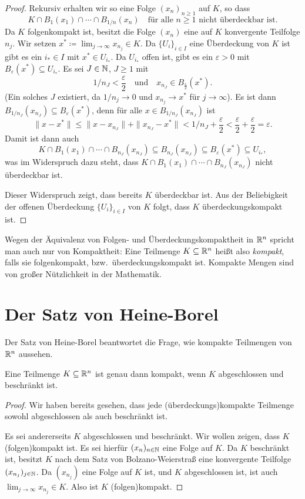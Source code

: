 \documentclass[a4paper,10pt]{article}
\begin{document}
\begin{proof}
 Rekursiv erhalten wir so eine Folge $(x_n)_{n \geq 1}$ auf $K$, so dass
 \[
  K \cap B_1(x_1) \cap \dotsb \cap B_{1/n}(x_n)
  \quad \text{für alle $n \geq 1$ nicht überdeckbar ist}.
 \]
 Da $K$ folgenkompakt ist, besitzt die Folge $(x_n)$ eine auf $K$ konvergente Teilfolge $n_j$. Wir setzen $x^* \coloneqq \lim_{j \to \infty} x_{n_j} \in K$. Da $\{U_i\}_{i \in I}$ eine Überdeckung von $K$ ist gibt es ein $i_* \in I$ mit $x^* \in U_{i_*}$. Da $U_{i_*}$ offen ist, gibt es ein $\varepsilon > 0$ mit $B_{\varepsilon}(x^*) \subseteq U_{i_*}$. Es sei $J \in \mathbb{N}$, $J \geq 1$ mit
 \[
  1/{n_J} < \frac{\varepsilon}{2}
  \quad
  \text{und}
  \quad
  x_{n_J} \in B_\frac{\varepsilon}{2}(x^*).
 \]
 (Ein solches $J$ existiert, da $1/{n_j} \to 0$ und $x_{n_j} \to x^*$ für $j \to \infty$). Es ist dann $B_{1/n_J}(x_{n_J}) \subseteq B_{\varepsilon}(x^*)$, denn für alle $x \in B_{1/n_J}(x_{n_J})$ ist
 \[
  \|x - x^*\|
  \leq \|x - x_{n_J}\| + \|x_{n_J} - x^*\|
  < 1/n_J + \frac{\varepsilon}{2}
  < \frac{\varepsilon}{2} + \frac{\varepsilon}{2}
  = \varepsilon.
 \]
 Damit ist dann auch
 \[
  K \cap B_1(x_1) \cap \dotsb \cap B_{n_J}(x_{n_J})
  \subseteq B_{n_J}(x_{n_J})
  \subseteq B_{\varepsilon}(x^*)
  \subseteq U_{i_*},
 \]
 was im Widerspruch dazu steht, dass $K \cap B_1(x_1) \cap \dotsb \cap B_{n_J}(x_{n_J})$ nicht überdeckbar ist.
  
 Dieser Widerspruch zeigt, dass bereits $K$ überdeckbar ist. Aus der Beliebigkeit der offenen Überdeckung $\{U_i\}_{i \in I}$ von $K$ folgt, dass $K$ überdeckungskompakt ist.
\end{proof}


Wegen der Äquivalenz von Folgen- und Überdeckungskompaktheit in $\mathbb{R}^n$ spricht man auch nur von Kompaktheit: Eine Teilmenge $K \subseteq \mathbb{R}^n$ heißt also \emph{kompakt}, falls sie folgenkompakt, bzw.\ überdeckungskompakt ist. Kompakte Mengen sind von großer Nützlichkeit in der Mathematik.




\section{Der Satz von Heine-Borel}
Der Satz von Heine-Borel beantwortet die Frage, wie kompakte Teilmengen von $\mathbb{R}^n$ aussehen.


\begin{thrm}
 Eine Teilmenge $K \subseteq \mathbb{R}^n$ ist genau dann kompakt, wenn $K$ abgeschlossen und beschränkt ist.
\end{thrm}
\begin{proof}
 Wir haben bereits gesehen, dass jede (überdeckungs)kompakte Teilmenge sowohl abgeschlossen als auch beschränkt ist.
 
 Es sei andererseits $K$ abgeschlossen und beschränkt. Wir wollen zeigen, dass $K$ (folgen)kompakt ist. Es sei hierfür $(x_n)_{n \in \mathbb{N}}$ eine Folge auf $K$. Da $K$ beschränkt ist, besitzt $K$ nach dem Satz von Bolzano-Weierstraß eine konvergente Teilfolge $(x_{n_j})_{j \in \mathbb{N}}$. Da $(x_{n_j})$ eine Folge auf $K$ ist, und $K$ abgeschlossen ist, ist auch $\lim_{j \to \infty} x_{n_j} \in K$. Also ist $K$ (folgen)kompakt.
\end{proof}
\end{document}
